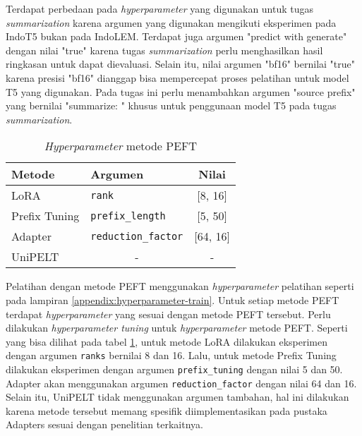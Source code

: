 Terdapat perbedaan pada \textit{hyperparameter} yang digunakan untuk tugas \textit{summarization} karena argumen yang digunakan mengikuti eksperimen pada IndoT5 bukan pada IndoLEM. Terdapat juga argumen "predict with generate" dengan nilai "true" karena tugas \textit{summarization} perlu menghasilkan hasil ringkasan untuk dapat dievaluasi. Selain itu, nilai argumen "bf16" bernilai "true" karena presisi "bf16" dianggap bisa mempercepat proses pelatihan untuk model T5 yang digunakan. Pada tugas ini perlu menambahkan argumen "source prefix" yang bernilai "summarize: " khusus untuk penggunaan model T5 pada tugas \textit{summarization}.

\begin{table}[h]
    \centering
    \caption{\textit{Hyperparameter} metode PEFT}
    \label{table:hyperparameter-PEFT}
    \begin{tabular}{l|l|c}
        \toprule
        \textbf{Metode} & \textbf{Argumen} & \textbf{Nilai} \\
        \midrule
        LoRA & \texttt{rank} & [8, 16] \\
        Prefix Tuning & \texttt{prefix\_length} & [5, 50] \\
        Adapter & \texttt{reduction\_factor} & [64, 16] \\
        UniPELT & \multicolumn{1}{c|}{-}  & - \\
        \bottomrule
    \end{tabular}
\end{table}

Pelatihan dengan metode PEFT  menggunakan \textit{hyperparameter} pelatihan seperti pada lampiran \ref{appendix:hyperparameter-train}. Untuk setiap metode PEFT terdapat \textit{hyperparameter} yang sesuai dengan metode PEFT tersebut. Perlu dilakukan \textit{hyperparameter tuning} untuk \textit{hyperparameter} metode PEFT. Seperti yang bisa dilihat pada tabel \ref{table:hyperparameter-PEFT}, untuk metode LoRA dilakukan eksperimen dengan argumen \texttt{ranks} bernilai 8 dan 16. Lalu, untuk metode Prefix Tuning dilakukan eksperimen dengan argumen \texttt{prefix\_tuning} dengan nilai 5 dan 50. Adapter akan menggunakan argumen \texttt{reduction\_factor} dengan nilai 64 dan 16. Selain itu, UniPELT tidak menggunakan argumen tambahan, hal ini dilakukan karena metode tersebut memang spesifik diimplementasikan pada pustaka Adapters sesuai dengan penelitian terkaitnya.
